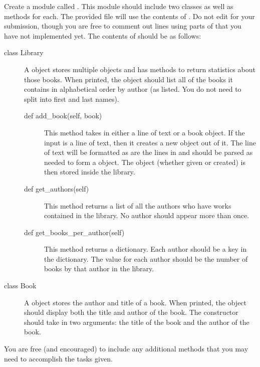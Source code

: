 \documentclass[11pt]{cselabheader}
\begin{document}
\begin{ex}[library.py]
    Create a module called . This module should include
    two classes as well as methods for each. The provided file
     will use the contents of
    . Do not edit  for
    your submission, though you are free to comment out lines using parts of
     that you have not implemented yet. The contents of
     should be as follows:

    \begin{description}
    \item[class Library] A  object stores multiple
        objects and has methods to return statistics about those books. When
        printed, the object should list all of the books it contains in
        alphabetical order by author (as listed. You do not need to split into
        first and last names).
        \begin{description}
        \item[def add\_book(self, book)] This method takes in either a line of
            text or a book object. If the input is a line of text, then it
            creates a new  object out of it. The line of
            text will be formatted as are the lines in 
            and should be parsed as needed to form a  object.
            The object (whether given or created) is then stored inside the
            library.
        \item[def get\_authors(self)] This method returns a list of all the
            authors who have works contained in the library. No author should
            appear more than once.
        \item[def get\_books\_per\_author(self)] This method returns a
            dictionary.
            Each author should be a key in the dictionary. The value for each
            author should be the number of books by that author in the library.
        \end{description}
    \item[class Book] A  object stores the author and title
        of a book. When printed, the object should display both the title and
        author of the book. The constructor should take in two arguments:
        the title of the book and the author of the book.
    \end{description}

    You are free (and encouraged) to include any additional methods that you may
    need to accomplish the tasks given.
\end{ex}
\end{document}
